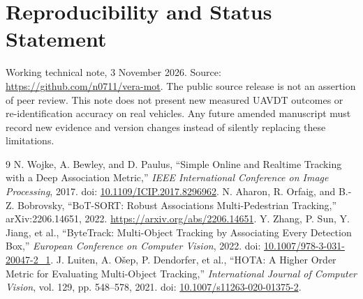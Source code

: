 \documentclass[11pt,a4paper]{article}
\begin{document}
\section*{Reproducibility and Status Statement}
Working technical note, 3 November 2026. Source: \url{https://github.com/n0711/vera-mot}. The public source release is not an assertion of peer review. This note does not present new measured UAVDT outcomes or re-identification accuracy on real vehicles. Any future amended manuscript must record new evidence and version changes instead of silently replacing these limitations.

\begin{thebibliography}{9}
 N. Wojke, A. Bewley, and D. Paulus, ``Simple Online and Realtime Tracking with a Deep Association Metric,'' \emph{IEEE International Conference on Image Processing}, 2017. doi: \href{https://doi.org/10.1109/ICIP.2017.8296962}{10.1109/ICIP.2017.8296962}.
 N. Aharon, R. Orfaig, and B.-Z. Bobrovsky, ``BoT-SORT: Robust Associations Multi-Pedestrian Tracking,'' arXiv:2206.14651, 2022. \url{https://arxiv.org/abs/2206.14651}.
 Y. Zhang, P. Sun, Y. Jiang, et al., ``ByteTrack: Multi-Object Tracking by Associating Every Detection Box,'' \emph{European Conference on Computer Vision}, 2022. doi: \href{https://doi.org/10.1007/978-3-031-20047-2_1}{10.1007/978-3-031-20047-2\_1}.
 J. Luiten, A. O\v{s}ep, P. Dendorfer, et al., ``HOTA: A Higher Order Metric for Evaluating Multi-Object Tracking,'' \emph{International Journal of Computer Vision}, vol. 129, pp. 548--578, 2021. doi: \href{https://doi.org/10.1007/s11263-020-01375-2}{10.1007/s11263-020-01375-2}.
\end{thebibliography}
\end{document}
